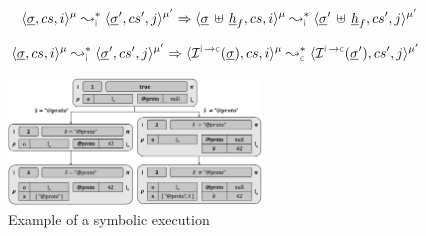 \begin{theorem}\label{teo:frame:property}
\hspace*{-0.28cm}$$
\transabssemrule{\istate, \cs, i}{\istate', \cs', j}{\mode}{\mode'}{\instrumented}\Rightarrow
        \transabssemrule{\istate \dunion \iheap_f, \cs, i}{\istate' \dunion \iheap_f, \cs', j}{\mode}{\mode'}{\instrumented} 
$$
\end{theorem}

\begin{lemma}\label{lemma:instrumented:semantics}
$$
\hspace*{-0.22cm}
\transabssemrule{\istate, \cs, i}{\istate', \cs', j}{\mode}{\mode'}{\instrumented} \Rightarrow \transabssemrule{\interpret{\instconc}{}(\istate), \cs, i}{\interpret{\instconc}{}(\istate'), \cs', j}{\mode}{\mode'}{\concrete} 
$$
\end{lemma}



%


\begin{figure}[!t]
\centering
\includegraphics[width=0.6\textwidth]{figures/symbSemEx.png}
\vspace*{-0.1cm}
\caption{Example of a \cosette symbolic execution}
\label{fig:sexecexample}
\vspace*{-0.3cm}
\end{figure}

